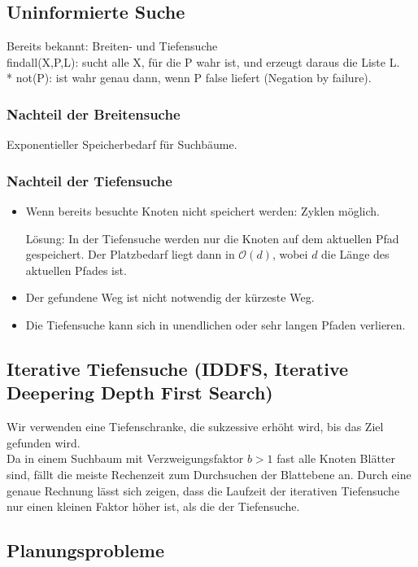 \documentclass[a4paper]{scrartcl}
\begin{document}
\subsection{Uninformierte Suche}
Bereits bekannt: Breiten- und Tiefensuche\\
findall(X,P,L): sucht alle X, für die P wahr ist, und erzeugt daraus die Liste L.\\*
not(P): ist wahr genau dann, wenn P false liefert (Negation by failure).

\subsubsection{Nachteil der Breitensuche} Exponentieller Speicherbedarf für Suchbäume.
\subsubsection{Nachteil der Tiefensuche}
\begin{itemize}
\item Wenn bereits besuchte Knoten nicht speichert werden: Zyklen möglich.

Lösung: In der Tiefensuche werden nur die Knoten auf dem aktuellen Pfad gespeichert. Der Platzbedarf liegt dann in $\mathcal{O}(d)$, wobei $d$ die Länge des aktuellen Pfades ist.

\item Der gefundene Weg ist nicht notwendig der kürzeste Weg.

\item Die Tiefensuche kann sich in unendlichen oder sehr langen Pfaden verlieren.

\end{itemize}

\subsection{Iterative Tiefensuche (IDDFS, Iterative Deepering Depth First Search)}
Wir verwenden eine Tiefenschranke, die sukzessive erhöht wird, bis das Ziel gefunden wird.\\
Da in einem Suchbaum mit Verzweigungsfaktor $b>1$ fast alle Knoten Blätter sind, fällt die meiste Rechenzeit zum Durchsuchen der Blattebene an. Durch eine genaue Rechnung lässt sich zeigen, dass die Laufzeit der iterativen Tiefensuche nur einen kleinen Faktor höher ist, als die der Tiefensuche.

\subsection{Planungsprobleme}
\end{document}
